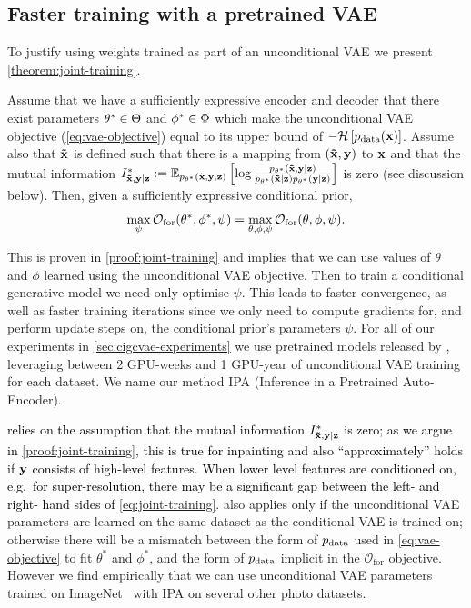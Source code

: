 \subsection{Faster training with a pretrained VAE}
To justify using weights trained as part of an unconditional VAE we present
\cref{theorem:joint-training}.
%
\begin{theorem} \label{theorem:joint-training} Assume that we have a
  sufficiently expressive encoder and decoder that there exist parameters
  ${\theta}^*\in\Theta$ and ${\phi}^*\in\Phi$ which make the
  unconditional VAE objective (\cref{eq:vae-objective}) equal to its upper bound of
  $-\mathcal{H}\left[ p_{\rm{data}}({\mathbf{x}}) \right]$. Assume also that $\mathbf{\tilde{x}}{}$ is
  defined such that there is a mapping from $(\mathbf{\tilde{x}}{},{\mathbf{y}})$ to ${\mathbf{x}}$ and
  that the mutual information ${I^*_{\mathbf{\tilde{x}}{},\mathbf{y}{}|\mathbf{z}{}}{} := \mathbb{E}_{p_{\theta^*}(\mathbf{\tilde{x}}{}, {\mathbf{y}},
      {\mathbf{z}})} \left[ \log \frac{p_{\theta^*}(\mathbf{\tilde{x}}{},{\mathbf{y}}|{\mathbf{z}})
      }{ p_{\theta^*}(\mathbf{\tilde{x}}{}|{\mathbf{z}})p_{\theta^*}({\mathbf{y}}|{\mathbf{z}}) }
    \right]}$ is zero (see discussion below). Then, given a sufficiently expressive
  conditional prior,
  \begin{equation} \label{eq:joint-training}
    \max_{\psi} \mathcal{O}_\mathrm{for}({\theta}^*, {\phi}^*, \psi) = \max_{\theta, \phi, \psi} \mathcal{O}_\mathrm{for}(\theta, \phi, \psi).
  \end{equation}
\end{theorem}
This is proven in \cref{proof:joint-training} and implies that we can use values
of $\theta$ and $\phi$ learned using the unconditional VAE objective. Then to
train a conditional generative model we need only optimise $\psi$. This
leads to faster convergence, as well as faster training iterations since we only
need to compute gradients for, and perform update steps on, the conditional prior's parameters $\psi$. For all of our experiments in
\cref{sec:cigcvae-experiments} we use pretrained models released by
\citet{child2020very}, leveraging between 2 GPU-weeks and 1 GPU-year of
unconditional VAE training for each dataset. We name our method IPA (Inference
in a Pretrained Auto-Encoder).

\textcolor{black}{ relies on the assumption that
  the mutual information $I^*_{\mathbf{\tilde{x}}{},\mathbf{y}{}|\mathbf{z}{}}$ is zero; as we argue in
  \cref{proof:joint-training}, this is true for inpainting and also
  ``approximately'' holds if ${\mathbf{y}}$ consists of high-level features. When
  lower level features are conditioned on, e.g.~for super-resolution, there may
  be a significant gap between the left- and right- hand sides of
  \cref{eq:joint-training}. }  also applies only if
the unconditional VAE parameters are learned on the same dataset as the
conditional VAE is trained on; otherwise there will be a mismatch between the
form of $p_{\rm{data}}$ used in \cref{eq:vae-objective} to fit $\theta^*$ and $\phi^*$, and
the form of $p_{\rm{data}}$ implicit in the $\mathcal{O}_\mathrm{for}$ objective.
However we find empirically that we can use unconditional VAE parameters trained
on ImageNet~\citep{deng2009imagenet} with IPA on several other photo datasets.

